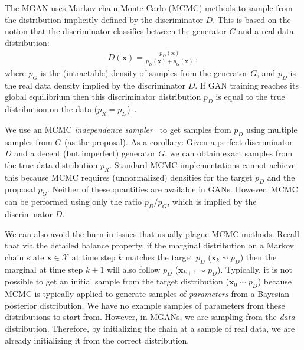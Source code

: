 \documentclass{article}
\renewcommand{\vec}[1]{{\boldsymbol{\mathbf{#1}}}} %
\newcommand{\set}[1]{\mathcal{#1}}
\newcommand{\sample}{\sim}
\newcommand{\PG}{{p_G}}
\newcommand{\PD}{{p_D}}
\newcommand{\PR}{{p_R}}
\newcommand{\setx}{\set{X}}
\begin{document}
The MGAN uses Markov chain Monte Carlo (MCMC) methods to sample from the distribution implicitly defined by the discriminator $D$.
This is based on the notion that the discriminator classifies between the generator $G$ and a real data distribution:
\begin{align}
  D(\vec x) = \frac{\PD(\vec x)}{\PD(\vec x) + \PG(\vec x)}\,,
\end{align}
where $\PG$ is the (intractable) density of samples from the generator $G$, and $\PD$ is the real data density implied by the discriminator $D$.
If GAN training reaches its global equilibrium then this discriminator distribution $\PD$ is equal to the true distribution on the data ($\PR = \PD$)~\citep{Goodfellow2014}.

We use an MCMC \emph{independence sampler}~\citep{Tierney1994} to get samples from $\PD$ using multiple samples from $G$ (as the proposal)\@.
As a corollary: Given a perfect discriminator $D$ and a decent (but imperfect) generator $G$, we can obtain exact samples from the true data distribution $\PR$.
Standard MCMC implementations cannot achieve this because MCMC requires (unnormalized) densities for the target $\PD$ and the proposal $\PG$.
Neither of these quantities are available in GANs.
However, MCMC can be performed using only the ratio $\PD / \PG$, which is implied by the discriminator $D$.

We can also avoid the burn-in issues that usually plague MCMC methods.
Recall that via the detailed balance property, if the marginal distribution on a Markov chain state $\vec x \in \setx$ at time step $k$ matches the target $\PD$ ($\vec x_k \sample \PD$) then the marginal at time step $k+1$ will also follow $\PD$ ($\vec x_{k+1} \sample \PD$)\@.
Typically, it is not possible to get an initial sample from the target distribution ($\vec x_0 \sample \PD$) because MCMC is typically applied to generate samples of \emph{parameters} from a Bayesian posterior distribution.
We have no example samples of parameters from these distributions to start from.
However, in MGANs, we are sampling from the \emph{data} distribution.
Therefore, by initializing the chain at a sample of real data, we are already initializing it from the correct distribution.
\end{document}
